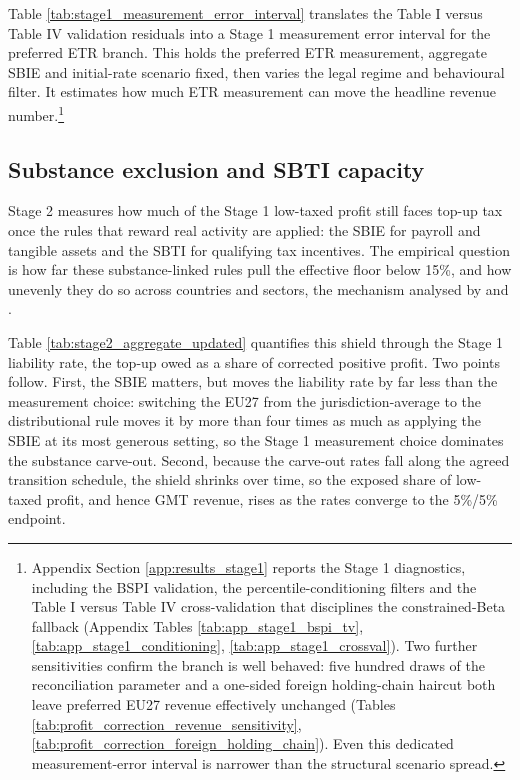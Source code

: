 \documentclass[11pt,a4paper]{article}
\begin{document}


Table \ref{tab:stage1_measurement_error_interval} translates the Table I versus Table IV validation residuals into a Stage 1 measurement error interval for the preferred ETR branch. This holds the preferred ETR measurement, aggregate SBIE and initial-rate scenario fixed, then varies the legal regime and behavioural filter. It estimates how much ETR measurement can move the headline revenue number.\footnote{Appendix Section \ref{app:results_stage1} reports the Stage 1 diagnostics, including the BSPI validation, the percentile-conditioning filters and the Table I versus Table IV cross-validation that disciplines the constrained-Beta fallback (Appendix Tables \ref{tab:app_stage1_bspi_tv}, \ref{tab:app_stage1_conditioning}, \ref{tab:app_stage1_crossval}). Two further sensitivities confirm the branch is well behaved: five hundred draws of the reconciliation parameter and a one-sided foreign holding-chain haircut both leave preferred EU27 revenue effectively unchanged (Tables \ref{tab:profit_correction_revenue_sensitivity}, \ref{tab:profit_correction_foreign_holding_chain}). Even this dedicated measurement-error interval is narrower than the structural scenario spread.}

\subsection{Substance exclusion and SBTI capacity}\label{sec:results_stage2}

Stage 2 measures how much of the Stage 1 low-taxed profit still faces top-up tax once the rules that reward real activity are applied: the SBIE for payroll and tangible assets and the SBTI for qualifying tax incentives. The empirical question is how far these substance-linked rules pull the effective floor below 15\%, and how unevenly they do so across countries and sectors, the mechanism analysed by \citet{devereux2023} and \citet{schjelderup2024}.



Table \ref{tab:stage2_aggregate_updated} quantifies this shield through the Stage 1 liability rate, the top-up owed as a share of corrected positive profit. Two points follow. First, the SBIE matters, but moves the liability rate by far less than the measurement choice: switching the EU27 from the jurisdiction-average to the distributional rule moves it by more than four times as much as applying the SBIE at its most generous setting, so the Stage 1 measurement choice dominates the substance carve-out. Second, because the carve-out rates fall along the agreed transition schedule, the shield shrinks over time, so the exposed share of low-taxed profit, and hence GMT revenue, rises as the rates converge to the 5\%/5\% endpoint. 
\end{document}
